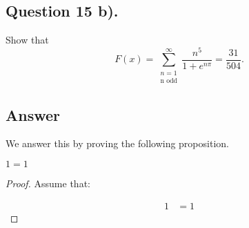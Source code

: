 \subsection{Question 15 b).}
\noindent
Show that
\[
    F(x)=\sum_{\substack{n=1\\ \text{n odd}}}^{\infty} \frac{n^5}{1+e^{n\pi}} = \frac{31}{504}.
\]

\subsection*{Answer}
\noindent
We answer this by proving the following proposition.

\begin{proposition}
    $1=1$
\end{proposition}

\begin{proof}
    Assume that:

    \begin{align*}
        1 &= 1
    \end{align*}

\end{proof}
